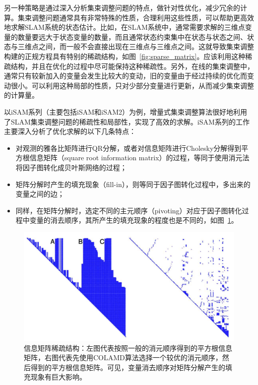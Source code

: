 另一种策略是通过深入分析集束调整问题的特点，做针对性优化，减少冗余的计算。集束调整问题通常具有非常特殊的性质，合理利用这些性质，可以帮助更高效地求解SLAM系统的状态估计。比如，在SLAM系统中，通常需要求解的三维点变量的数量要远大于状态变量的数量，而且通常状态约束集中在状态与状态之间、状态与三维点之间，而一般不会直接出现在三维点与三维点之间。这就导致集束调整构建的正规方程具有特别的稀疏结构，如图~\ref{fig:sparse_matrix}。应该利用这种稀疏结构，并且在优化的过程中尽可能保持这种稀疏性。另外，在线的集束调整中，通常只有较新加入的变量会发生比较大的变动，旧的变量由于经过持续的优化而变动很小。可以利用这种局部的性质，只对少部分变量进行更新，从而减少集束调整的计算量。

以iSAM系列（主要包括iSAM\citep{kaess2008isam}和iSAM2\citep{kaess2012isam2}）为例，增量式集束调整算法很好地利用了SLAM集束调整问题的稀疏性和局部性，实现了高效的求解。iSAM系列的工作主要深入分析了优化求解的以下几条特点：
\begin{itemize}
    \item 对观测的雅各比矩阵进行QR分解，或者对信息矩阵进行Cholesky分解得到平方根信息矩阵（square root information matrix）的过程，等同于使用消元法将因子图转化成贝叶斯网络的过程；
    \item 矩阵分解时产生的填充现象（fill-in），则等同于因子图转化过程中，多出来的变量之间的边；
    \item 同样，在矩阵分解时，选定不同的主元顺序（pivoting）对应于因子图转化过程中变量的消去顺序，其所产生的填充现象的程度也是不同的，如图~\ref{fig:fill_in}。
\end{itemize}

\begin{figure}[htb!]
    \centering
    \includegraphics[width=.8\textwidth]{Pictures/sparse_pattern.png}
    \caption{信息矩阵稀疏结构\citep{kaess2008isam}：左图代表按照一般的消元顺序得到的平方根信息矩阵，右图代表先使用COLAMD算法选择一个较优的消元顺序，然后得到的平方根信息矩阵。可见，变量消去顺序对矩阵分解产生的填充现象有巨大影响。}
    \label{fig:fill_in}
\end{figure}

